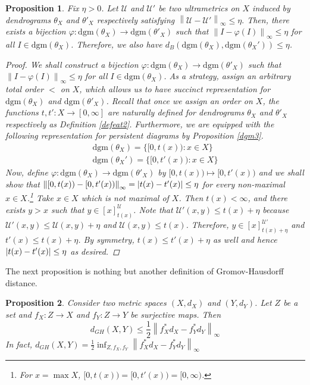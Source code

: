 \documentclass[a4paper,12pt]{article}
\newtheorem{proposition}{Proposition}[section]
\newcommand{\dgm}{\mathrm{dgm}}
\DeclarePairedDelimiter{\abs}{\lvert}{\rvert}
\newcommand{\norm}[1]{\left\lVert#1\right\rVert}
\begin{document}
\begin{proposition} Fix $\eta>0$. Let $\mathcal{U}$ and $\mathcal{U}'$ be two ultrametrics on $X$ induced by dendrograms $\theta_X$ and $\theta'_X$ respectively satisfying $\norm{\mathcal{U}-\mathcal{U'}}_{\infty}\leq \eta.$ Then, there exists a bijection $\varphi:\dgm(\theta_X)\rightarrow \dgm(\theta'_X)$ such that $\norm{I-\varphi(I)}_{\infty}\leq \eta$ for all $I\in \dgm(\theta_X)$. Therefore, we also have $d_B(\dgm(\theta_X), \dgm(\theta_X'))\leq \eta$.

\begin{proof}
We shall construct a bijection $\varphi:\dgm(\theta_X)\rightarrow \dgm(\theta'_X)$ such that $\norm{I-\varphi(I)}_{\infty}\leq \eta$ for all $I\in \dgm(\theta_X)$. As a strategy, assign an arbitrary total order $<$ on $X$, which allows us to have succinct representation for $\dgm(\theta_X)$ and $\dgm(\theta'_X)$. Recall that once we assign an order on $X$, the functions $t, t':X\rightarrow [0,\infty]$ are naturally defined for dendrograms $\theta_X$ and $\theta'_X$ respectively as Definition \ref{defeat2}. Furthermore, we are equipped with the following representation for persistent diagrams by Proposition \ref{dgm3}. 
\begin{align*}
\dgm(\theta_X)=\{[0,t(x)): x\in X\}\\
\dgm(\theta_X')=\{[0,t'(x)): x\in X\}
\end{align*}
Now, define $\varphi:\dgm(\theta_X)\rightarrow \dgm(\theta'_X)$ by $[0,t(x))\mapsto [0,t'(x))$ and we shall show that $\norm{[0,t(x))-[0,t'(x))}_{\infty}=\abs{t(x)-t'(x)}\leq \eta$ for every non-maximal $x\in X$.\footnote{For $x=\max X$, $[0,t(x))=[0,t'(x))=[0,\infty)$.} Take $x\in X$ which is not maximal of $X$. Then $t(x)<\infty$, and there exists $y>x$ such that $y\in [x]_{t(x)}^{\mathcal{U}}$. Note that $\mathcal{U}'(x,y)\leq t(x)+\eta$ because $\mathcal{U}'(x,y)\leq \mathcal{U}(x,y)+\eta$ and $\mathcal{U}(x,y)\leq t(x)$. Therefore, $y\in[x]_{t(x)+\eta}^{\mathcal{U}'}$ and $t'(x)\leq t(x)+\eta$. By symmetry, $t(x)\leq t'(x)+\eta$ as well and hence $\abs{t(x)-t'(x)}\leq \eta$ as desired.\end{proof} \label{prop4.7}
\end{proposition}
The next proposition is nothing but another definition of Gromov-Hausdorff distance.


\begin{proposition} Consider two metric spaces $(X, d_X)$ and $(Y,d_Y)$. Let $Z$ be a set and $f_X:Z\rightarrow X$ and $f_Y:Z\rightarrow Y$ be surjective maps. Then 
$$d_{GH}(X,Y)\leq \frac{1}{2}\norm{f^*_Xd_X-f^*_Yd_Y}_{\infty}$$
In fact, $\displaystyle d_{GH}(X,Y)=\frac{1}{2}\inf_{Z,f_X,f_Y}\norm{f^*_Xd_X-f^*_Yd_Y}_{\infty}$\label{prop4.8}
\end{proposition}
\end{document}
